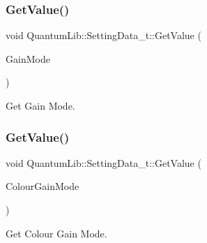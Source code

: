 \subsubsection{\texorpdfstring{Get\+Value()}{GetValue()}\hspace{0.1cm}{\footnotesize\ttfamily [13/26]}}
{\footnotesize\ttfamily void Quantum\+Lib\+::\+Setting\+Data\+\_\+t\+::\+Get\+Value (\begin{DoxyParamCaption}\item[{\mbox{\hyperlink{namespace_quantum_lib_a20b6e658baa33fde788739a47dab2e13}{e\+Gain\+Mode\+\_\+t}} \&}]{Gain\+Mode }\end{DoxyParamCaption})\hspace{0.3cm}{\ttfamily [inline]}}



Get Gain Mode. 

\mbox{\label{struct_quantum_lib_1_1_setting_data__t_a97a54e9aa97b5a2895d61446716b7fd6}} 
\subsubsection{\texorpdfstring{Get\+Value()}{GetValue()}\hspace{0.1cm}{\footnotesize\ttfamily [14/26]}}
{\footnotesize\ttfamily void Quantum\+Lib\+::\+Setting\+Data\+\_\+t\+::\+Get\+Value (\begin{DoxyParamCaption}\item[{\mbox{\hyperlink{namespace_quantum_lib_a4e404872667f9386ba59973f4b29fe65}{e\+Colour\+Gain\+Mode\+\_\+t}} \&}]{Colour\+Gain\+Mode }\end{DoxyParamCaption})\hspace{0.3cm}{\ttfamily [inline]}}



Get Colour Gain Mode. 

\mbox{\label{struct_quantum_lib_1_1_setting_data__t_a77418c42e6e6577e19141a8f733b972b}} 
